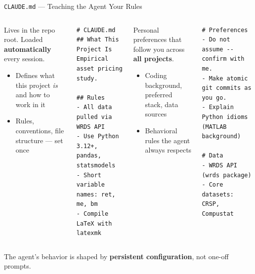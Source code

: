 \documentclass[aspectratio=169, 11pt]{beamer}
\newcommand{\emphgold}[1]{\alert{\textbf{#1}}}
\begin{document}
\begin{frame}[fragile,shrink=31]{\texttt{CLAUDE.md} --- Teaching the Agent Your Rules}
\begin{columns}[T]
\begin{keyinsight}
Lives in the repo root. Loaded \emphgold{automatically} every session.
\begin{itemize}
  \item Defines what this project \emph{is} and how to work in it
  \item Rules, conventions, file structure --- set once
\end{itemize}
\end{keyinsight}
\vspace{0.1cm}
\begin{codeblock}
\scriptsize
\begin{verbatim}
# CLAUDE.md
## What This Project Is
Empirical asset pricing study.

## Rules
- All data pulled via WRDS API
- Use Python 3.12+, pandas, statsmodels
- Short variable names: ret, me, bm
- Compile LaTeX with latexmk
\end{verbatim}
\end{codeblock}

\begin{keyinsight}
Personal preferences that follow you across \emphgold{all projects}.
\begin{itemize}
  \item Coding background, preferred stack, data sources
  \item Behavioral rules the agent always respects
\end{itemize}
\end{keyinsight}
\vspace{0.1cm}
\begin{codeblock}
\scriptsize
\begin{verbatim}
# Preferences
- Do not assume -- confirm with me.
- Make atomic git commits as you go.
- Explain Python idioms (MATLAB background)

# Data
- WRDS API (wrds package)
- Core datasets: CRSP, Compustat
\end{verbatim}
\end{codeblock}
\end{columns}
\vspace{0.15cm}
\begin{center}
\small The agent's behavior is shaped by \emphgold{persistent configuration}, not one-off prompts.
\end{center}
\end{frame}
\end{document}
